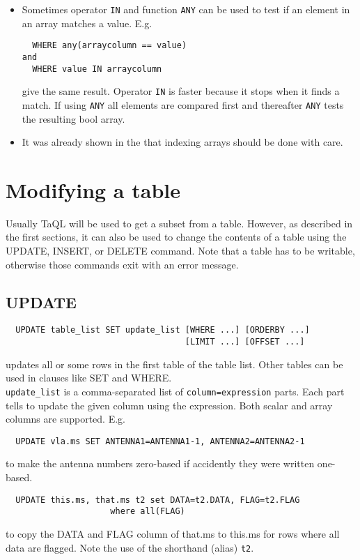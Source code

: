\begin{itemize}
\item
Sometimes operator \texttt{IN} and function \texttt{ANY} can be used to test
if an element in an array matches a value. E.g.
\begin{verbatim}
  WHERE any(arraycolumn == value)
and
  WHERE value IN arraycolumn
\end{verbatim}
give the same result.
Operator \texttt{IN} is faster because it stops when it finds a
match. If using \texttt{ANY} all elements are compared first and thereafter
\texttt{ANY} tests the resulting bool array.

\item
It was already shown in the 
that indexing arrays should be done with care.
\end{itemize}


\section{\label{TAQL:MODIFYING}Modifying a table}
Usually TaQL will be used to get a subset from a table. However, as
described in the first sections, it can also be used to change the
contents of a table using the UPDATE, INSERT, or DELETE command.
Note that a table has to be writable, otherwise those commands
exit with an error message.

\subsection{UPDATE}
\begin{verbatim}
  UPDATE table_list SET update_list [WHERE ...] [ORDERBY ...]
                                    [LIMIT ...] [OFFSET ...]
\end{verbatim}
updates all or some rows in the first table of the table list. Other
tables can be used in clauses like SET and WHERE.
\\\texttt{update\_list}
is a comma-separated list of \texttt{column=expression} parts.
Each part tells to update the given column using the
expression. Both scalar and array columns are supported.
E.g.
\begin{verbatim}
  UPDATE vla.ms SET ANTENNA1=ANTENNA1-1, ANTENNA2=ANTENNA2-1
\end{verbatim}
to make the antenna numbers zero-based if accidently they were
written one-based.

\begin{verbatim}
  UPDATE this.ms, that.ms t2 set DATA=t2.DATA, FLAG=t2.FLAG
                     where all(FLAG)
\end{verbatim}
to copy the DATA and FLAG column of that.ms to this.ms for rows where
all data are flagged. Note the use of the shorthand (alias) \texttt{t2}.


